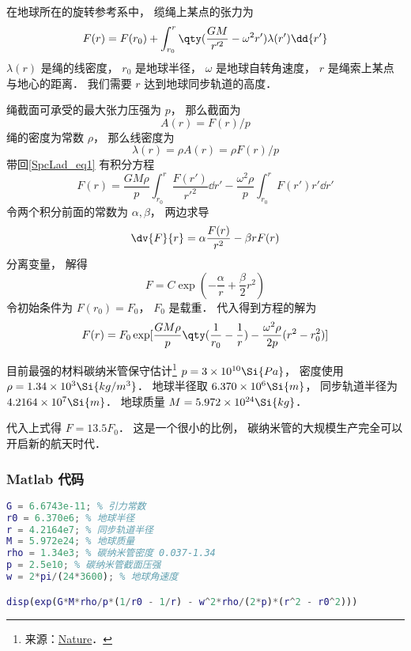 
\begin{issues}
\issueDraft
\end{issues}

在地球所在的旋转参考系中， 缆绳上某点的张力为
\begin{equation}\label{SpcLad_eq1}
F(r) = F(r_0) + \int_{r_0}^{r} \qty(\frac{GM}{r'^2} - \omega^2 r') \lambda(r') \dd{r'}
\end{equation}
$\lambda(r)$ 是绳的线密度， $r_0$ 是地球半径， $\omega$ 是地球自转角速度， $r$ 是绳索上某点与地心的距离． 我们需要 $r$ 达到地球同步轨道的高度．

绳截面可承受的最大张力压强为 $p$， 那么截面为
\begin{equation}
A(r) = F(r)/p
\end{equation}
绳的密度为常数 $\rho$， 那么线密度为
\begin{equation}
\lambda(r) = \rho A(r) = \rho F(r)/p
\end{equation}
带回\autoref{SpcLad_eq1} 有积分方程
\begin{equation}
F(r) = \frac{GM\rho}{p} \int_{r_0}^{r} \frac{F(r')}{r'^2} \dd{r'} - \frac{\omega^2\rho}{p}\int_{r_0}^r F(r') r' \dd{r'}
\end{equation}
令两个积分前面的常数为 $\alpha, \beta$， 两边求导
\begin{equation}
\dv{F}{r} = \alpha \frac{F(r)}{r^2} - \beta r F(r)
\end{equation}
分离变量， 解得
\begin{equation}
F = C\exp(-\frac{\alpha}{r} + \frac{\beta}{2} r^2)
\end{equation}
令初始条件为 $F(r_0) = F_0$， $F_0$ 是载重． 代入得到方程的解为
\begin{equation}
F(r) = F_0 \exp[\frac{GM\rho}{p} \qty(\frac{1}{r_0} - \frac{1}{r}) - \frac{\omega^2\rho}{2p}(r^2 - r_0^2)]
\end{equation}

目前最强的材料碳纳米管保守估计\footnote{来源：\href{https://www.nature.com/articles/s41467-019-10959-7}{Nature}．} $p = 3\times 10^{10} \Si{Pa}$， 密度使用 $\rho = 1.34\times 10^{3} \Si{kg/m^3}$． 地球半径取 $6.370\times 10^6\Si{m}$， 同步轨道半径为 $4.2164\times 10^7 \Si{m}$． 地球质量 $M = 5.972 \times 10^{24} \Si{kg}$．

代入上式得 $F = 13.5 F_0$． 这是一个很小的比例， 碳纳米管的大规模生产完全可以开启新的航天时代．

\subsubsection{Matlab 代码}
\begin{lstlisting}[language=matlab]
G = 6.6743e-11; % 引力常数
r0 = 6.370e6; % 地球半径
r = 4.2164e7; % 同步轨道半径
M = 5.972e24; % 地球质量
rho = 1.34e3; % 碳纳米管密度 0.037-1.34
p = 2.5e10; % 碳纳米管截面压强
w = 2*pi/(24*3600); % 地球角速度

disp(exp(G*M*rho/p*(1/r0 - 1/r) - w^2*rho/(2*p)*(r^2 - r0^2)))
\end{lstlisting}
